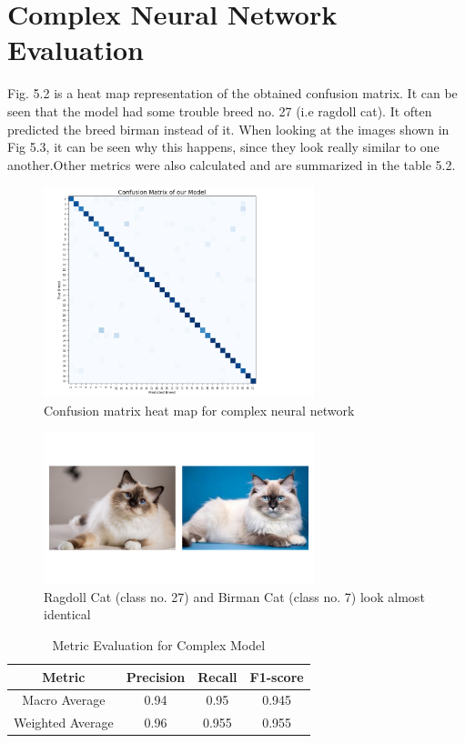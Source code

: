 \section{Complex Neural Network Evaluation} 
Fig. 5.2 is a heat map representation of the obtained confusion matrix. It can be seen that the model had some trouble breed no. 27 (i.e ragdoll cat). It often predicted the breed birman instead of it. When looking at the images shown in Fig 5.3, it can be seen why this happens, since they look really similar to one another.Other metrics were also calculated and are summarized in
 the table 5.2.
    \begin{figure}[H]
    \centering
    \includegraphics[width=0.7\textwidth]{figures/confusion matrix.png}
    \caption{Confusion matrix heat map for complex neural network}
    \label{fig:example_images}
\end{figure}
    \begin{figure}[H]
    \centering
    \includegraphics[width=0.7\textwidth]{figures/breed_compare.png}
    \caption{Ragdoll Cat (class no. 27) and Birman Cat (class no. 7) look almost identical}
    \label{fig:example_images}
\end{figure}
 \begin{table}[H]
    \centering
    \caption{Metric Evaluation for Complex Model}
    \begin{tabular}{|c|c|c|c|}
        \hline
        Metric & Precision & Recall & F1-score \\ 
        \hline
        Macro Average & 0.94 & 0.95 & 0.945 \\ 
        \hline
        Weighted Average & 0.96 & 0.955 & 0.955 \\ 
        \hline
    \end{tabular}
    \label{tab:complex_model_metrics}
\end{table}

